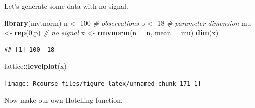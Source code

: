 \documentclass[]{book}
\newenvironment{Shaded}{\begin{snugshade}}{\end{snugshade}}
\newcommand{\KeywordTok}[1]{\textcolor[rgb]{0.13,0.29,0.53}{\textbf{#1}}}
\newcommand{\DataTypeTok}[1]{\textcolor[rgb]{0.13,0.29,0.53}{#1}}
\newcommand{\DecValTok}[1]{\textcolor[rgb]{0.00,0.00,0.81}{#1}}
\newcommand{\StringTok}[1]{\textcolor[rgb]{0.31,0.60,0.02}{#1}}
\newcommand{\CommentTok}[1]{\textcolor[rgb]{0.56,0.35,0.01}{\textit{#1}}}
\newcommand{\OtherTok}[1]{\textcolor[rgb]{0.56,0.35,0.01}{#1}}
\newcommand{\ControlFlowTok}[1]{\textcolor[rgb]{0.13,0.29,0.53}{\textbf{#1}}}
\newcommand{\OperatorTok}[1]{\textcolor[rgb]{0.81,0.36,0.00}{\textbf{#1}}}
\newcommand{\NormalTok}[1]{#1}
\theoremstyle{definition}
\theoremstyle{definition}
\theoremstyle{definition}
\theoremstyle{remark}
\begin{document}
Let's generate some data with no signal.

\begin{Shaded}
\begin{Highlighting}[]
\KeywordTok{library}\NormalTok{(mvtnorm)}
\NormalTok{n <-}\StringTok{ }\DecValTok{100} \CommentTok{# observations}
\NormalTok{p <-}\StringTok{ }\DecValTok{18} \CommentTok{# parameter dimension}
\NormalTok{mu <-}\StringTok{ }\KeywordTok{rep}\NormalTok{(}\DecValTok{0}\NormalTok{,p) }\CommentTok{# no signal}
\NormalTok{x <-}\StringTok{ }\KeywordTok{rmvnorm}\NormalTok{(}\DataTypeTok{n =}\NormalTok{ n, }\DataTypeTok{mean =}\NormalTok{ mu)}
\KeywordTok{dim}\NormalTok{(x)}
\end{Highlighting}
\end{Shaded}

\begin{verbatim}
## [1] 100  18
\end{verbatim}

\begin{Shaded}
\begin{Highlighting}[]
\NormalTok{lattice}\OperatorTok{::}\KeywordTok{levelplot}\NormalTok{(x)}
\end{Highlighting}
\end{Shaded}

\texttt{[image: Rcourse\_files/figure-latex/unnamed-chunk-171-1]}

Now make our own Hotelling function.

\begin{Shaded}
\end{Shaded}
\end{document}
